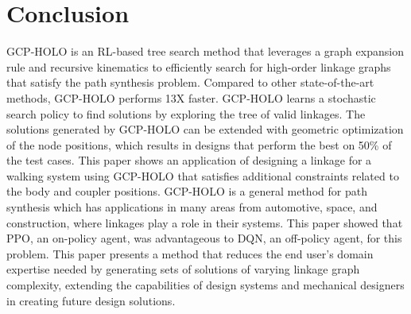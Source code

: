 \section{Conclusion}
GCP-HOLO is an RL-based tree search method that leverages a graph expansion rule and recursive kinematics to efficiently search for high-order linkage graphs that satisfy the path synthesis problem. Compared to other state-of-the-art methods, GCP-HOLO performs 13X faster. GCP-HOLO learns a stochastic search policy to find solutions by exploring the tree of valid linkages. The solutions generated by GCP-HOLO can be extended with geometric optimization of the node positions, which results in designs that perform the best on 50\% of the test cases. This paper shows an application of designing a linkage for a walking system using GCP-HOLO that satisfies additional constraints related to the body and coupler positions. GCP-HOLO is a general method for path synthesis which has applications in many areas from automotive, space, and construction, where linkages play a role in their systems. This paper showed that PPO, an on-policy agent, was advantageous to DQN, an off-policy agent, for this problem. This paper presents a method that reduces the end user’s domain expertise needed by generating sets of solutions of varying linkage graph complexity, extending the capabilities of design systems and mechanical designers in creating future design solutions.

